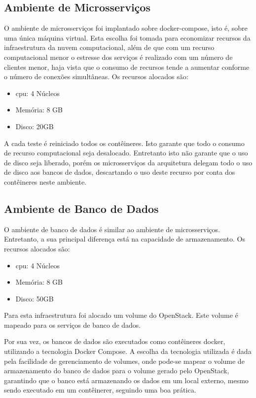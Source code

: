 \subsection{Ambiente de Microsserviços}
\label{sec:ambiente_mic}

O ambiente de microsserviços foi implantado sobre docker-compose, isto é, sobre uma única máquina virtual.
%
Esta escolha foi tomada para economizar recursos da infraestrutura da nuvem computacional, além de que com um recurso computacional menor o estresse dos serviços é realizado com um número de clientes menor, haja vista que o consumo de recursos tende a aumentar conforme o número de conexões simultâneas.
%
Os recursos alocados são:

\begin{itemize}
  \item \ac{cpu}: 4 Núcleos
  \item Memória: 8 GB
  \item Disco: 20GB
\end{itemize}

A cada teste é reiniciado todos os contêineres. Isto garante que todo o consumo de recurso computacional seja desalocado.
%
Entretanto isto não garante que o uso de disco seja liberado, porém os microsserviços da arquitetura delegam todo o uso de disco aos bancos de dados, descartando o uso deste recurso por conta dos contêineres neste ambiente.

\subsection{Ambiente de Banco de Dados}
\label{sec:ambiente_db}

O ambiente de banco de dados é similar ao ambiente de microsserviços.
%
Entretanto, a sua principal diferença está na capacidade de armazenamento. Os recursos alocados são:

\begin{itemize}
  \item \ac{cpu}: 4 Núcleos
  \item Memória: 8 GB
  \item Disco: 50GB
\end{itemize}

Para esta infraestrutura foi alocado um volume do OpenStack.
%
Este volume é mapeado para os serviços de banco de dados.

Por sua vez, os bancos de dados são executados como contêineres docker, utilizando a tecnologia Docker Compose.
%
A escolha da tecnologia utilizada é dada pela facilidade de gerenciamento de volumes, onde pode-se mapear o volume de armazenamento do banco de dados para o volume gerado pelo OpenStack, garantindo que o banco está armazenando os dados em um local externo, mesmo sendo executado em um contêinerer, seguindo uma boa prática.


